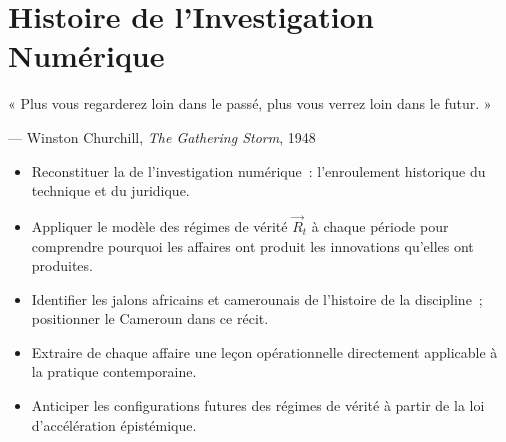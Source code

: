 %

\chapter{Histoire de l'Investigation Numérique}
\label{chap:histoire}

\epigraph{%
    « Plus vous regarderez loin dans le passé, plus vous verrez loin dans
    le futur. »%
}{--- Winston Churchill, \textit{The Gathering Storm}, 1948}


\begin{boxobjectifs}
\begin{itemize}
    \item Reconstituer la  de l'investigation
          numérique~: l'enroulement historique du technique et du juridique.
    \item Appliquer le modèle des régimes de vérité $\vec{R}_t$ à chaque
          période pour comprendre pourquoi les affaires ont produit les
          innovations qu'elles ont produites.
    \item Identifier les jalons africains et camerounais de l'histoire
          de la discipline~; positionner le Cameroun dans ce récit.
    \item Extraire de chaque affaire une leçon opérationnelle directement
          applicable à la pratique contemporaine.
    \item Anticiper les configurations futures des régimes de vérité à
          partir de la loi d'accélération épistémique.
\end{itemize}
\end{boxobjectifs}

